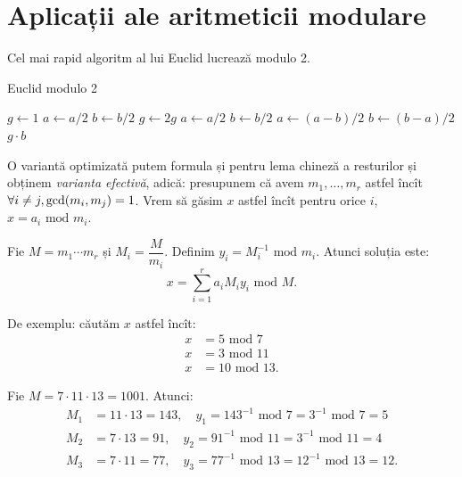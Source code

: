 \chapter{Aplicații ale aritmeticii modulare}
\label{sec:apl-mod}

Cel mai rapid algoritm al lui Euclid lucrează modulo 2.

\begin{algorithm}
  \caption{Euclid modulo 2}
  \label{alg:euclid-2}
  \begin{algorithmic}[1]
    \State $ g \gets 1 $
    \State $ a \gets a/2 $
    \State $ b \gets b/2 $
    \State $ g \gets 2g $
    \EndWhile
     \State $ a \gets a/2 $ \EndWhile
     \State $ b \gets b/2 $ \EndWhile
     $ a \gets (a-b)/2 $
    \Else $ b \gets (b - a)/2 $
    \EndIf
    \EndWhile
    \Return $ g \cdot b $
    \EndProcedure
  \end{algorithmic}
\end{algorithm}

O variantă optimizată putem formula și pentru lema chineză a resturilor și
obținem \emph{varianta efectivă}, adică: presupunem că avem $ m_1, \dots, m_r $
astfel încît $ \forall i \neq j, \mathrm{gcd}(m_i, m_j) = 1 $. Vrem să găsim $ x $
astfel încît pentru orice $ i $, $ x = a_i \text{ mod } m_i $.

Fie $ M = m_1 \cdots m_r $ și $ M_i = \dfrac{M}{m_i} $. Definim
$ y_i = M_i^{-1} \text{ mod } m_i $. Atunci soluția este:
\[
  x = \sum_{i = 1}^r a_i M_i y_i \text{ mod } M.
\]

De exemplu: căutăm $ x $ astfel încît:
\begin{align*}
  x &= 5 \text{ mod } 7 \\
  x &= 3 \text{ mod } 11 \\
  x &= 10 \text{ mod } 13.
\end{align*}

Fie $ M = 7 \cdot 11 \cdot 13 = 1001 $. Atunci:
\begin{align*}
  M_1 &= 11 \cdot 13 = 143, \quad y_1 = 143^{-1} \text{ mod } 7 = 3^{-1} \text{ mod } 7 = 5 \\
  M_2 &= 7 \cdot 13 = 91, \quad y_2 = 91^{-1} \text{ mod } 11 = 3^{-1} \text{ mod } 11 = 4 \\
  M_3 &= 7 \cdot 11 = 77, \quad y_3 = 77^{-1} \text{ mod } 13 = 12^{-1} \text{ mod } 13 = 12.
\end{align*}

